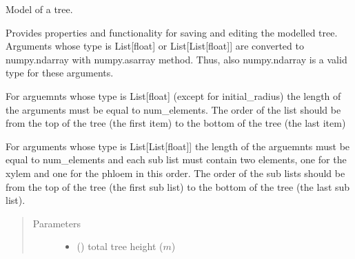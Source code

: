 \documentclass[letterpaper,10pt,english]{sphinxmanual}
\begin{document}
\begin{fulllineitems}
\label{\detokenize{index:src.tree.Tree}}
Model of a tree.

Provides properties and functionality for saving and editing the modelled tree. Arguments whose
type is List{[}float{]} or List{[}List{[}float{]}{]} are converted to numpy.ndarray with numpy.asarray method.
Thus, also numpy.ndarray is a valid type for these arguments.

For arguemnts whose type is List{[}float{]} (except for initial\_radius) the length of the arguments must
be equal to num\_elements. The order of the list should be from the top of the tree (the first item) to the
bottom of the tree (the last item)

For arguments whose type is List{[}List{[}float{]}{]} the length of the arguemnts must be equal to num\_elements
and each sub list must contain two elements, one for the xylem and one for the phloem in this order. The
order of the sub lists should be from the top of the tree (the first sub list) to the bottom of the tree
(the last sub list).
\begin{quote}\begin{description}
\item[{Parameters}] \leavevmode\begin{itemize}
\item {} 
 () \textendash{} total tree height (\(m\))


\end{itemize}
\end{description}
\end{quote}
\end{fulllineitems}
\end{document}
